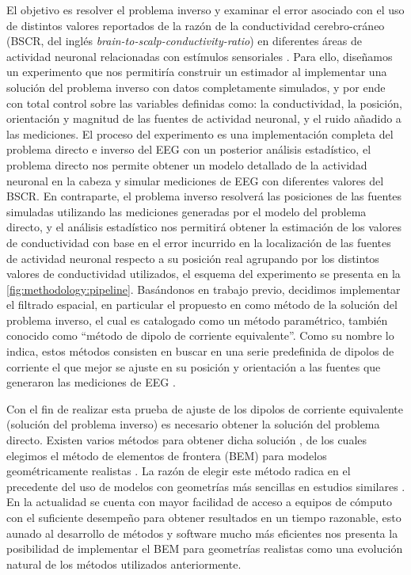 El objetivo es resolver el problema inverso y examinar el error asociado con el uso de distintos valores reportados de la razón de la conductividad cerebro-cráneo (BSCR, del inglés \emph{brain-to-scalp-conductivity-ratio}) en diferentes áreas de actividad neuronal relacionadas con estímulos sensoriales \cite{McCann2019}. Para ello, diseñamos un experimento que nos permitiría construir un estimador al implementar una solución del problema inverso con datos completamente simulados, y por ende con total control sobre las variables definidas como: la conductividad, la posición, orientación y magnitud de las fuentes de actividad neuronal, y el ruido añadido a las mediciones. El proceso del experimento es una implementación completa del problema directo e inverso del EEG con un posterior análisis estadístico, el problema directo nos permite obtener un modelo detallado de la actividad neuronal en la cabeza y simular mediciones de EEG con diferentes valores del BSCR. En contraparte, el problema inverso resolverá las posiciones de las fuentes simuladas utilizando las mediciones generadas por el modelo del problema directo, y el análisis estadístico nos permitirá obtener la estimación de los valores de conductividad con base en el error incurrido en la localización de las fuentes de actividad neuronal respecto a su posición real agrupando por los distintos valores de conductividad utilizados, el esquema del experimento se presenta en la \cref{fig:methodology:pipeline}. Basándonos en trabajo previo, decidimos implementar el filtrado espacial, en particular el propuesto en \cite{VanVeen1988} como método de la solución del problema inverso, el cual es catalogado como un método paramétrico, también conocido como ``método de dipolo de corriente equivalente''. Como su nombre lo indica, estos métodos consisten en buscar en una serie predefinida de dipolos de corriente el que mejor se ajuste en su posición y orientación a las fuentes que generaron las mediciones de EEG  \cite{Hallez2007}.

Con el fin de realizar esta prueba de ajuste de los dipolos de corriente equivalente (solución del problema inverso) es necesario obtener la solución del problema directo. Existen varios métodos para obtener dicha solución \cite{Mosher1999}, de los cuales elegimos el método de elementos de frontera (BEM) para modelos geométricamente realistas \cite{Ermer2001}. La razón de elegir este método radica en el precedente del uso de modelos con geometrías más sencillas en estudios similares \cite{Gutierrez2004}. En la actualidad se cuenta con mayor facilidad de acceso a equipos de cómputo con el suficiente desempeño para obtener resultados en un tiempo razonable, esto aunado al desarrollo de métodos y software mucho más eficientes \cite{open,Clerc2010} nos presenta la posibilidad de implementar el BEM para geometrías realistas como una evolución natural de los métodos utilizados anteriormente.

